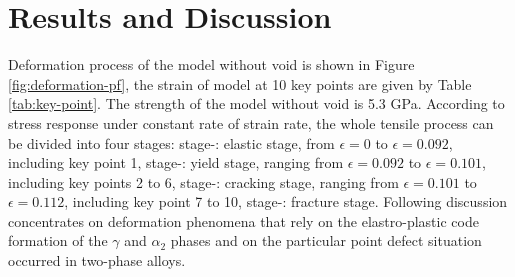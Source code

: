 \documentclass[materials,article,accept,moreauthors,pdftex,10pt,a4paper]{Definitions/mdpi}
\begin{document}
\section{Results and Discussion}\label{section:RD}





Deformation process of the model without void is shown in Figure \ref{fig:deformation-pf}, the strain of model at 10 key points are given by Table \ref{tab:key-point}. The strength of the model without void is 5.3 GPa. According to stress response under constant rate of strain rate, the whole tensile process can be divided into four stages:
stage-\uppercase\expandafter{}: elastic stage, from $\epsilon = 0$ to $\epsilon = 0.092$, including key point 1,
stage-\uppercase\expandafter{}: yield stage, ranging from $\epsilon = 0.092$ to $\epsilon = 0.101$, including key points 2 to 6,
stage-\uppercase\expandafter{}: cracking stage, ranging from $\epsilon = 0.101$ to $\epsilon = 0.112$, including key point 7 to 10,
stage-\uppercase\expandafter{}: fracture stage. Following discussion concentrates on deformation phenomena that rely on the elastro-plastic code formation of the $\gamma$ and $\alpha_2$ phases and on the particular point defect situation occurred in two-phase alloys.
\end{document}
